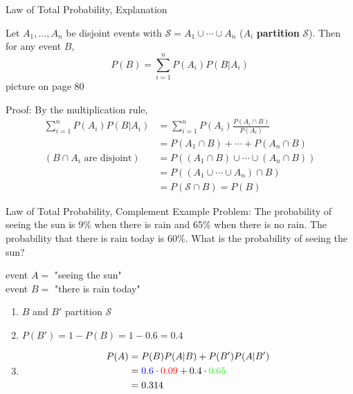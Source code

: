 \documentclass[handout]{beamer}
\newcommand{\blue}[1]{{\color{blue} #1}}
\newcommand{\red}[1]{{\color{red} #1}}
\newcommand{\grn}[1]{{\color{green} #1}}
\newcommand{\nl}[1]{\vspace{#1 em}}
\begin{document}
    \begin{frame}{Law of Total Probability, Explanation}
        \begin{block}{}
        Let $A_1,\dots,A_n$ be disjoint events with $\mathcal{S}=A_1\cup\cdots\cup A_n$ ($A_i$ \textbf{partition} $\mathcal {S}$). Then for any event $B$,
        $$P(B)=\sum_{i=1}^n P(A_i)P(B|A_i)$$
        picture on page 80
        \end{block}
        
        Proof: By the multiplication rule, \begin{align*}
        \sum_{i=1}^n P(A_i)P(B|A_i) &= 
        \sum_{i=1}^n P(A_i) \frac{P(A_i \cap B)}{P(A_i)} \\
        &= P(A_1\cap B)+\cdots+P(A_n\cap B)\\
        (B\cap A_i\text{ are disjoint})&= P((A_1\cap B)\cup\cdots\cup (A_n\cap B)) \\
        &= P((A_1 \cup \cdots \cup A_n) \cap B) \\
        &= P(\mathcal{S} \cap B) = P(B)
        \end{align*}
    \end{frame}

    \begin{frame}{Law of Total Probability, Complement Example}
        Problem: The probability of \red{seeing the sun is 9\% when there is rain} and \grn{65\% when there is no rain}. The probability that there is \blue{rain today is 60\%}. What is the probability of seeing the sun?
        \pause \begin{center}
            event $A =$ "seeing the sun"\\ \nl{0.5}
            event $B =$ "there is rain today"
        \end{center}
        \begin{enumerate}
            \pause \item $B$ and $B'$ partition $\mathcal{S}$
            \pause \item $P(B') = 1 - P(B) = 1 - 0.6 = 0.4$
            \pause \item \begin{align*}
                P(A) &= P(B)P(A|B)+P(B')P(A|B') \\
                 &= \blue{0.6}\cdot \red{0.09}+0.4\cdot \grn{0.65}\\
                 & = 0.314\\
            \end{align*}
        \end{enumerate}
    \end{frame}
\end{document}
